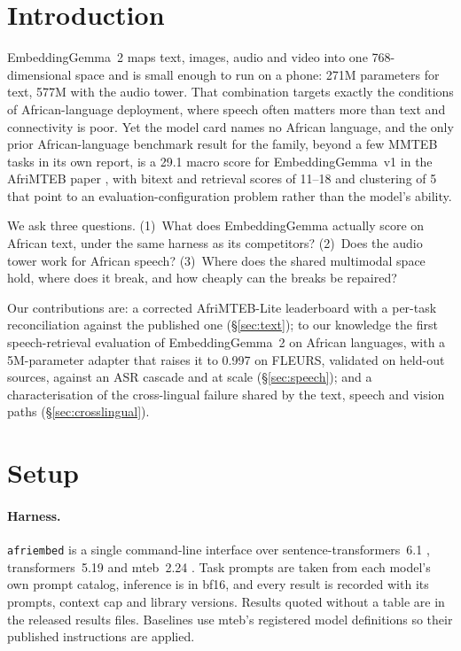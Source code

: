 \documentclass[conference]{IEEEtran}
\newcommand{\eg}{EmbeddingGemma}
\newcommand{\egtwo}{EmbeddingGemma~2}
\begin{document}
\section{Introduction}

\egtwo{} \cite{google2026embeddinggemma2} maps text, images, audio and video
into one 768-dimensional space and is small enough to run on a phone: 271M
parameters for text, 577M with the audio tower. That combination targets
exactly the conditions of African-language deployment, where speech often
matters more than text and connectivity is poor. Yet the model card names no
African language, and the only prior African-language benchmark result for the family, beyond a
few MMTEB tasks in its own report, is a 29.1 macro score for \eg{}~v1 \cite{vera2025embeddinggemma} in the AfriMTEB
paper \cite{uemura2026afrimteb}, with bitext and retrieval scores of 11--18 and clustering of 5 that point to an evaluation-configuration problem rather than the model's ability.

We ask three questions. (1)~What does \eg{} actually score on African text,
under the same harness as its competitors? (2)~Does the audio tower work for
African speech? (3)~Where does the shared multimodal space hold, where does it
break, and how cheaply can the breaks be repaired?

Our contributions are: a corrected AfriMTEB-Lite leaderboard with a per-task
reconciliation against the published one (\S\ref{sec:text}); to our knowledge the first speech-retrieval evaluation of \egtwo{} on African languages, with a
5M-parameter adapter that raises it to 0.997 on FLEURS, validated on held-out sources,
against an ASR cascade and at scale (\S\ref{sec:speech}); and a
characterisation of the cross-lingual failure shared by the text, speech and
vision paths (\S\ref{sec:crosslingual}).

\section{Setup}
\label{sec:setup}

\paragraph{Harness.}
\texttt{afriembed} is a single command-line interface over
sentence-transformers~6.1 \cite{reimers2019sentencebert}, transformers~5.19
and mteb~2.24 \cite{muennighoff2023mteb}. Task prompts are taken from each
model's own prompt catalog, inference is in bf16, and every result is recorded with its prompts, context cap and library versions. Results quoted without a table are in the released results files. Baselines use mteb's
registered model definitions so their published instructions are applied.
\end{document}
